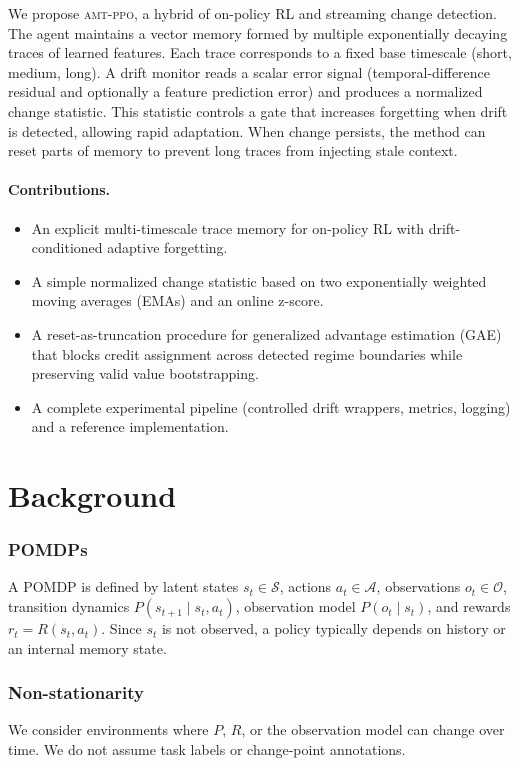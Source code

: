 \documentclass{article}
\newcommand{\AMT}{\textsc{amt-ppo}}
\begin{document}
We propose \AMT, a hybrid of on-policy RL and streaming change detection. The agent maintains a vector memory formed by multiple exponentially decaying traces of learned features. Each trace corresponds to a fixed base timescale (short, medium, long). A drift monitor reads a scalar error signal (temporal-difference residual and optionally a feature prediction error) and produces a normalized change statistic. This statistic controls a gate that increases forgetting when drift is detected, allowing rapid adaptation. When change persists, the method can reset parts of memory to prevent long traces from injecting stale context.

\paragraph{Contributions.}
\begin{itemize}
  \item An explicit multi-timescale trace memory for on-policy RL with drift-conditioned adaptive forgetting.
  \item A simple normalized change statistic based on two exponentially weighted moving averages (EMAs) and an online z-score.
  \item A reset-as-truncation procedure for generalized advantage estimation (GAE) that blocks credit assignment across detected regime boundaries while preserving valid value bootstrapping.
  \item A complete experimental pipeline (controlled drift wrappers, metrics, logging) and a reference implementation.
\end{itemize}

\section{Background}

\subsubsection*{POMDPs}
A POMDP is defined by latent states $s_t \in \mathcal{S}$, actions $a_t \in \mathcal{A}$, observations $o_t \in \mathcal{O}$, transition dynamics $P(s_{t+1}\mid s_t,a_t)$, observation model $P(o_t\mid s_t)$, and rewards $r_t = R(s_t,a_t)$. Since $s_t$ is not observed, a policy typically depends on history or an internal memory state.

\subsubsection*{Non-stationarity}
We consider environments where $P$, $R$, or the observation model can change over time. We do not assume task labels or change-point annotations.
\end{document}

